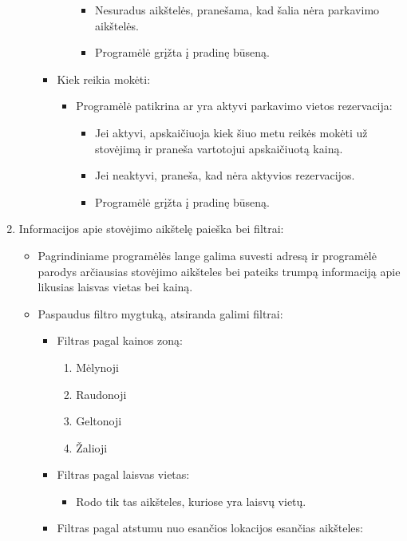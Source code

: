 \documentclass{VUMIFPSkursinis}
\begin{document}
\begin{enumerate}
\begin{itemize}
\begin{itemize}
\begin{itemize}
\begin{itemize}
									\item Nesuradus aikštelės, pranešama, kad šalia nėra parkavimo aikštelės.
									\item Programėlė grįžta į pradinę būseną.
								\end{itemize}
						\end{itemize}					
					\item Kiek reikia mokėti:
						\begin{itemize}
							\item Programėlė patikrina ar yra aktyvi parkavimo vietos rezervacija:
								\begin{itemize}
									\item Jei aktyvi, apskaičiuoja kiek šiuo metu reikės mokėti už stovėjimą ir praneša vartotojui apskaičiuotą kainą.
									\item Jei neaktyvi, praneša, kad nėra aktyvios rezervacijos.
									\item Programėlė grįžta į pradinę būseną.
								\end{itemize}
						\end{itemize}
				\end{itemize}
		\end{itemize}
	\item Informacijos apie stovėjimo aikštelę paieška bei filtrai:
		\begin{itemize}
			\item Pagrindiniame programėlės lange galima suvesti adresą ir programėlė parodys arčiausias stovėjimo aikšteles bei pateiks trumpą informaciją apie likusias laisvas vietas bei kainą.
			\item Paspaudus filtro mygtuką, atsiranda galimi filtrai:
				\begin{itemize}
					\item Filtras pagal kainos zoną:
						\begin{enumerate}
							\item Mėlynoji
							\item Raudonoji
							\item Geltonoji
							\item Žalioji
						\end{enumerate}
					\item Filtras pagal laisvas vietas:
						\begin{itemize}
							\item Rodo tik tas aikšteles, kuriose yra laisvų vietų.
						\end{itemize}
					\item Filtras pagal atstumu nuo esančios lokacijos esančias aikšteles:

\end{itemize}
\end{itemize}
\end{enumerate}
\end{document}
